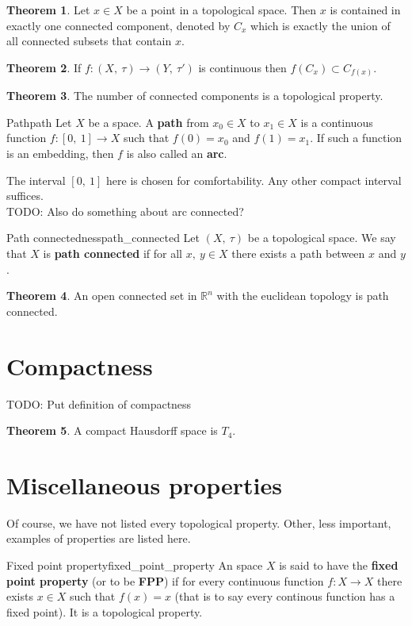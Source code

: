 \documentclass[a4paper]{book}
\theoremstyle{definition}
\newtheorem{theorem}{Theorem}[section]
\theoremstyle{ejemplo}
\theoremstyle{demostracion}
\newcommand{\reales}{\mathbb{R}}
\begin{document}
\begin{theorem}
	Let $x \in X$ be a point in a topological space. Then $x$ is contained in exactly one connected component, denoted by $C_x$ which is exactly the union of all connected subsets that contain $x$.
\end{theorem}

\begin{theorem}
	If $f: (X,\ \tau) \rightarrow (Y,\ \tau')$ is continuous then $f(C_x) \subset C_{f(x)}$.
\end{theorem}

\begin{theorem}
	The number of connected components is a topological property.
\end{theorem}

\begin{define}{Path}{path}
	Let $X$ be a space. A \textbf{path} from $x_0 \in X$ to $x_1 \in X$ is a continuous function $f: [0,\ 1] \rightarrow X$ such that $f(0) = x_0$ and $f(1) = x_1$. If such a function is an embedding, then $f$ is also called an \textbf{arc}.
\end{define}

The interval $[0,\ 1]$ here is chosen for comfortability. Any other compact interval suffices.\\ 
TODO: Also do something about arc connected?

\begin{define}{Path connectedness}{path_connected}
	Let $(X,\ \tau)$ be a topological space. We say that $X$ is \textbf{path connected} if for all $x,\ y \in X$ there exists a path between $x$ and $y$.
\end{define}

\begin{theorem}
	An open connected set in $\reales^n$ with the euclidean topology is path connected.
\end{theorem}



\section{Compactness}\label{sect_compactness}
TODO: Put definition of compactness
\begin{theorem}\label{thm_compact_haus}
	A compact Hausdorff space is $T_4$.
\end{theorem}

\section{Miscellaneous properties}
Of course, we have not listed every topological property. Other, less important, examples of properties are listed here.
\begin{define}{Fixed point property}{fixed_point_property}
	An space $X$ is said to have the \textbf{fixed point property} (or to be \textbf{FPP}) if for every continuous function $f: X \rightarrow X$ there exists $x \in X$ such that $f(x) = x$ (that is to say every continous function has a fixed point). It is a topological property.
\end{define}
\end{document}
